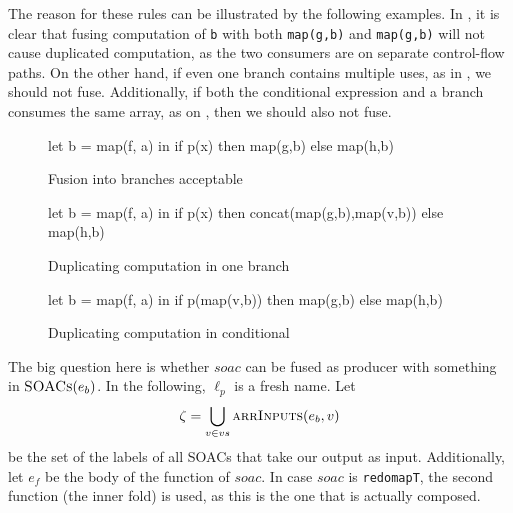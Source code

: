 \begin{description}[style=nextline]
The reason for these rules can be illustrated by the following
examples.  In , it is clear that fusing
computation of \texttt{b} with both \texttt{map(g,b)} and
\texttt{map(g,b)} will not cause duplicated computation, as the two
consumers are on separate control-flow paths.  On the other hand, if
even one branch contains multiple uses, as in
, we should not fuse.  Additionally, if
both the conditional expression and a branch consumes the same array,
as on , then we should also not
fuse.

\begin{figure}
\begin{center}
\begin{bcolorcode}
let b = map(f, a) in
if p(x) then map(g,b)
        else map(h,b)
\end{bcolorcode}
\end{center}
\caption{Fusion into branches acceptable}
\label{fig:fuse-across-if-ok}
\end{figure}

\begin{figure}
\begin{center}
\begin{bcolorcode}
let b = map(f, a) in
if p(x) then concat(map(g,b),map(v,b))
        else map(h,b)
\end{bcolorcode}
\end{center}
\caption{Duplicating computation in one branch}
\label{fig:fuse-across-if-bad}
\end{figure}

\begin{figure}
\begin{center}
\begin{bcolorcode}
let b = map(f, a) in
if p(map(v,b)) then map(g,b)
               else map(h,b)
\end{bcolorcode}
\end{center}
\caption{Duplicating computation in conditional}
\label{fig:fuse-across-if-bad-condition}
\end{figure}

\item[Case $e \equiv \texttt{let \{$vs$\} = $soac$ in $e_{b}$}$]

  The big question here is whether $soac$ can be fused as producer
  with something in $\textsc{SOACs}(e_{b})$.  In the following, $\ell_{p}$ is
  a fresh name.  Let
  \[
  \zeta = \bigcup_{v \in vs} \textsc{arrInputs}(e_{b},v)
  \]
  be the set of the labels of all SOACs that take our output as input.
  Additionally, let $e_{f}$ be the body of the function of $soac$.  In
  case $soac$ is \texttt{redomapT}, the second function (the inner
  fold) is used, as this is the one that is actually composed.


\end{description}
